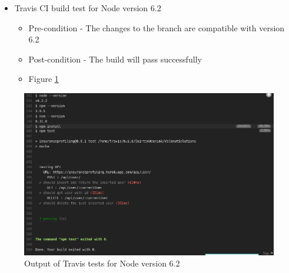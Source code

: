 \documentclass{article}
\begin{document}
\begin{itemize}
\cleardoublepage
\item Travis CI build test for Node version 6.2
	\begin{itemize}
	\item Pre-condition - The changes to the branch are compatible with version 6.2
	\item Post-condition - The build will pass successfully 
	\item Figure \ref{fig:6_2}
	\end{itemize}	
\end{itemize}

\begin{figure}[h]
  \centering
      \includegraphics[width=\textwidth]{images/6_2.png}
  \caption{Output of Travis tests for Node version 6.2}
  \label{fig:6_2}
\end{figure}


\cleardoublepage
\end{document}

